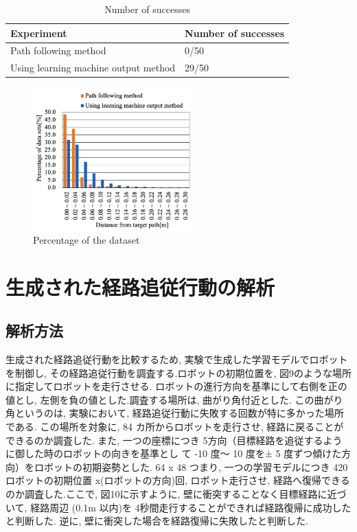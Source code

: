 \documentclass{jarticle}
\begin{document}
\begin{table}[htbp]
  \caption{Number of successes} \vspace*{2mm}\hspace*{-3mm}
    \begin{tabular}{|l|l|}
      \hline\hline
      Experiment & Number of successes \\
      \hline\hline
      Path following method & 0/50 \\
      Using learning machine output method & 29/50 \\
      \hline
    \end{tabular}
\end {table}


\begin{figure}[htbp]
  \centering
   \includegraphics[height=55mm]{./figs/data1.png}
   \caption{Percentage of the dataset}
\end{figure}


\section{生成された経路追従行動の解析}
\subsection{解析方法}
生成された経路追従行動を比較するため, 実験で生成した学習モデルでロボットを制御し, 
その経路追従行動を調査する.ロボットの初期位置を,  図9のような場所に指定してロボットを走行させる.
ロボットの進行方向を基準にして右側を正の値とし, 左側を負の値とした.調査する場所は, 曲がり角付近とした. 
この曲がり角というのは, 実験において, 経路追従行動に失敗する回数が特に多かった場所である.
この場所を対象に,  84 カ所からロボットを走行させ, 経路に戻ることができるのか調査した.
また, 一つの座標につき 5方向（目標経路を追従するように御した時のロボットの向きを基準とし
て -10 度〜 10 度を± 5 度ずつ傾けた方向）をロボットの初期姿勢とした. 64 x 48 つまり,  
一つの学習モデルにつき 420 ロボットの初期位置 x(ロボットの方向)回, ロボット走行させ, 
経路へ復帰できるのか調査した.ここで, 図10に示すように, 壁に衝突することなく目標経路に近づいて, 
経路周辺 (0.1m 以内)を 4秒間走行することができれば経路復帰に成功したと判断した.
逆に, 壁に衝突した場合を経路復帰に失敗したと判断した.
\end{document}
